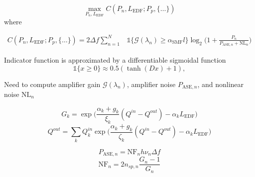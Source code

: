 \documentclass[10pt]{beamer}
\begin{document}
\begin{frame}
	\begin{equation*}
		\max_{P_n, L_{\text{EDF}}} C(P_n, L_{\text{EDF}}; P_p, \{\ldots\})
	\end{equation*}
	where
	
	\begin{align*} 
	C(P_n, L_{\text{EDF}}; P_p, \{\ldots\}) = 2\Delta f\sum_{n=1}^N &\mathds{1}\{\mathcal{G}(\lambda_n) \geq \alpha_{\text{SMF}}l\}\log_2\Big(1 + \frac{P_n}{P_{\text{ASE}, n} + \mathrm{NL}_n}\Big) 
	\end{align*}

	Indicator function is approximated by a differentiable sigmoidal function
	\begin{equation*}
	\mathds{1}\{x \geq 0\} \approx 0.5(\tanh(Dx) + 1),
	\end{equation*}
	
	Need to compute amplifier gain $\mathcal{G}(\lambda_n)$, amplifier noise $P_{\text{ASE}, n}$, and nonlinear noise $\mathrm{NL}_n$
\end{frame}

\begin{frame}

	
	
	\begin{equation} \label{eq:semi_analytical_gain}
	G_k = \exp\Big(\frac{\alpha_k + g_k}{\xi_k}(Q^{in} - Q^{out}) - \alpha_kL_{\text{EDF}}\Big)
	\end{equation}
	\begin{equation} \label{eq:out-photon-flux}
	Q^{out} = \sum_kQ^{in}_k\exp\Big(\frac{\alpha_k + g_k}{\zeta_k}(Q^{in} - Q^{out}) - \alpha_kL_{\text{EDF}}\Big)
	\end{equation}

	\begin{equation}
	P_{\text{ASE}, n} = \mathrm{NF}_nh\nu_n\Delta f
	\end{equation}
	\begin{equation}
	\mathrm{NF}_n = 2n_{sp, n}\frac{G_n-1}{G_n}
	\end{equation}
\end{frame}
\end{document}
